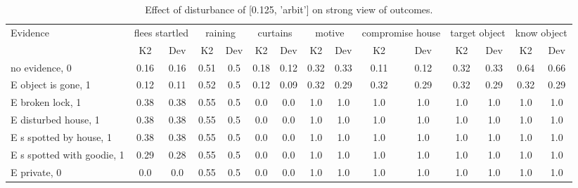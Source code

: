 \begin{table}\begin{tabular}{l|cc|cc|cc|cc|cc|cc|cc}\toprule\multirow{2}{*}{Evidence} & \multicolumn{2}{c}{flees startled}& \multicolumn{2}{c}{raining}& \multicolumn{2}{c}{curtains}& \multicolumn{2}{c}{motive}& \multicolumn{2}{c}{compromise house}& \multicolumn{2}{c}{target object}& \multicolumn{2}{c}{know object}\\& {K2} & {Dev}& {K2} & {Dev}& {K2} & {Dev}& {K2} & {Dev}& {K2} & {Dev}& {K2} & {Dev}& {K2} & {Dev}\\\midrule
no evidence, 0 & 0.16&0.16&0.51&0.5&\cellcolor{Bittersweet}0.18&\cellcolor{Bittersweet}0.12&0.32&0.33&0.11&0.12&0.32&0.33&0.64&0.66\\E object is gone, 1 & 0.12&0.11&0.52&0.5&0.12&0.09&0.32&0.29&0.32&0.29&0.32&0.29&0.32&0.29\\E broken lock, 1 & 0.38&0.38&\cellcolor{Bittersweet}0.55&\cellcolor{Bittersweet}0.5&0.0&0.0&1.0&1.0&1.0&1.0&1.0&1.0&1.0&1.0\\E disturbed house, 1 & 0.38&0.38&\cellcolor{Bittersweet}0.55&\cellcolor{Bittersweet}0.5&0.0&0.0&1.0&1.0&1.0&1.0&1.0&1.0&1.0&1.0\\E s spotted by house, 1 & 0.38&0.38&\cellcolor{Bittersweet}0.55&\cellcolor{Bittersweet}0.5&0.0&0.0&1.0&1.0&1.0&1.0&1.0&1.0&1.0&1.0\\E s spotted with goodie, 1 & 0.29&0.28&\cellcolor{Bittersweet}0.55&\cellcolor{Bittersweet}0.5&0.0&0.0&1.0&1.0&1.0&1.0&1.0&1.0&1.0&1.0\\E private, 0 & 0.0&0.0&\cellcolor{Bittersweet}0.55&\cellcolor{Bittersweet}0.5&0.0&0.0&1.0&1.0&1.0&1.0&1.0&1.0&1.0&1.0\\\bottomrule\end{tabular}\caption{Effect of disturbance of [0.125, 'arbit'] on strong view of outcomes.}\end{table}